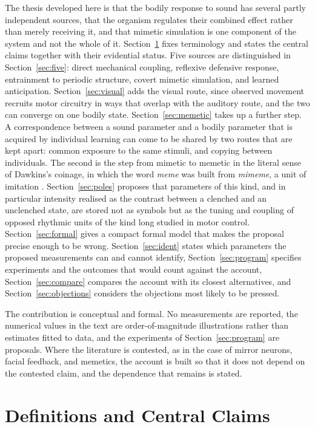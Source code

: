 \documentclass[11pt]{article}
\theoremstyle{plain}
\theoremstyle{definition}
\begin{document}
The thesis developed here is that the bodily response to sound has several partly independent sources, that the organism regulates their combined effect rather than merely receiving it, and that mimetic simulation is one component of the system and not the whole of it. Section~\ref{sec:claims} fixes terminology and states the central claims together with their evidential status. Five sources are distinguished in Section~\ref{sec:five}: direct mechanical coupling, reflexive defensive response, entrainment to periodic structure, covert mimetic simulation, and learned anticipation. Section~\ref{sec:visual} adds the visual route, since observed movement recruits motor circuitry in ways that overlap with the auditory route, and the two can converge on one bodily state. Section~\ref{sec:memetic} takes up a further step. A correspondence between a sound parameter and a bodily parameter that is acquired by individual learning can come to be shared by two routes that are kept apart: common exposure to the same stimuli, and copying between individuals. The second is the step from mimetic to memetic in the literal sense of Dawkins's coinage, in which the word \textit{meme} was built from \textit{mimeme}, a unit of imitation \citep{dawkins1976}. Section~\ref{sec:poles} proposes that parameters of this kind, and in particular intensity realised as the contrast between a clenched and an unclenched state, are stored not as symbols but as the tuning and coupling of opposed rhythmic units of the kind long studied in motor control. Section~\ref{sec:formal} gives a compact formal model that makes the proposal precise enough to be wrong. Section~\ref{sec:ident} states which parameters the proposed measurements can and cannot identify, Section~\ref{sec:program} specifies experiments and the outcomes that would count against the account, Section~\ref{sec:compare} compares the account with its closest alternatives, and Section~\ref{sec:objections} considers the objections most likely to be pressed.

The contribution is conceptual and formal. No measurements are reported, the numerical values in the text are order-of-magnitude illustrations rather than estimates fitted to data, and the experiments of Section~\ref{sec:program} are proposals. Where the literature is contested, as in the case of mirror neurons, facial feedback, and memetics, the account is built so that it does not depend on the contested claim, and the dependence that remains is stated.

\section{Definitions and Central Claims}\label{sec:claims}
\end{document}
